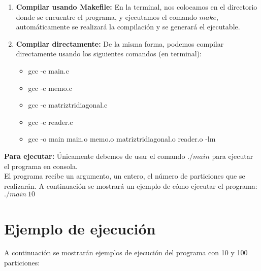 \documentclass[12pt]{article}
\begin{document}
\begin{enumerate}
	\item \textbf{Compilar usando Makefile:} En la terminal, nos colocamos en el directorio donde se encuentre el programa, y ejecutamos el comando $make$, automáticamente se realizará la compilación y se generará el ejecutable.\\
	\item \textbf{Compilar directamente:} De la misma forma, podemos compilar directamente usando los siguientes comandos (en terminal):\\
	\begin{itemize}
		\item gcc -c main.c
		\item gcc -c memo.c
		\item gcc -c matriztridiagonal.c
		\item gcc -c reader.c
		\item gcc -o main main.o memo.o matriztridiagonal.o reader.o -lm
	\end{itemize}
\end{enumerate}

\textbf{Para ejecutar:} Únicamente debemos de usar el comando $./main$ para ejecutar el programa en consola.\\
El programa recibe un argumento, un entero, el número de particiones que se realizarán. A continuación se mostrará un ejemplo de cómo ejecutar el programa:\\

$./main\ 10$

\section{Ejemplo de ejecución}

A continuación se mostrarán ejemplos de ejecución del programa con 10 y 100 particiones:\\

\begin{figure}[H]
	\centering
	\hfill
\end{figure}

\begin{figure}[H]
	\centering
	\hfill
\end{figure}
\end{document}

